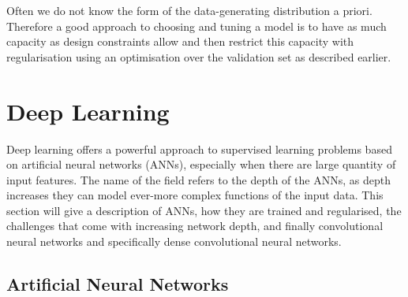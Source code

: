 Often we do not know the form of the data-generating distribution a priori. Therefore a good approach to choosing and tuning a model is to have as much capacity as design constraints allow and then restrict this capacity with regularisation using an optimisation over the validation set as described earlier.

\section{Deep Learning}

Deep learning offers a powerful approach to supervised learning problems based on artificial neural networks (ANNs), especially when there are large quantity of input features. 
The name of the field refers to the depth of the ANNs, as depth increases they can model ever-more complex functions of the input data. 
This section will give a description of ANNs, how they are trained and regularised, the challenges that come with increasing network depth, and finally convolutional neural networks and specifically dense convolutional neural networks.  

\subsection{Artificial Neural Networks}

